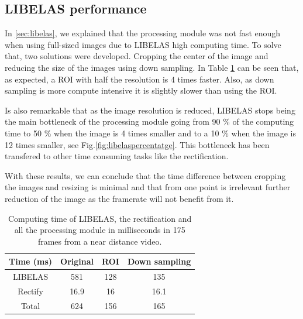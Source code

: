 \documentclass[10pt,a4paper,twocolumn,twoside]{article}
\begin{document}
	
	\subsection{LIBELAS performance}
	\label{sec:resizeperformance}
	In \ref{sec:libelas}, we explained that the processing module was not fast enough when using full-sized images due to LIBELAS high computing time. To solve that, two solutions were developed. Cropping the center of the image and reducing the size of the images using down sampling. In Table \ref{tab:timeprocess} can be seen that, as expected, a ROI with half the resolution is 4 times faster. Also, as down sampling is more compute intensive it is slightly slower than using the ROI.  
	
	Is also remarkable that as the image resolution is reduced, LIBELAS stops being the main bottleneck of the processing module going from 90 \% of the computing time to 50 \% when the image is 4 times smaller and to a 10 \% when the image is 12 times smaller, see Fig.\ref{fig:libelaspercentatge}. This bottleneck has been transfered to other time consuming tasks like the rectification.
	
	With these results, we can conclude that the time difference between cropping the images and resizing is minimal and that from one point is irrelevant further reduction of the image as the framerate will not benefit from it.  
	
	\begin{table}
		\centering
		\begin{tabular}{@{}cccc@{}}
			\toprule
			Time (ms) & Original & ROI & Down sampling \\ \midrule
			LIBELAS   & 581      & 128 & 135           \\
			Rectify   & 16.9     & 16  & 16.1          \\
			Total     & 624      & 156 & 165           \\ \bottomrule
		\end{tabular}
		\caption{Computing time of LIBELAS, the rectification and all the processing module in milliseconds in 175 frames from a near distance video.}
		\label{tab:timeprocess}
	\end{table}
	
\end{document}
